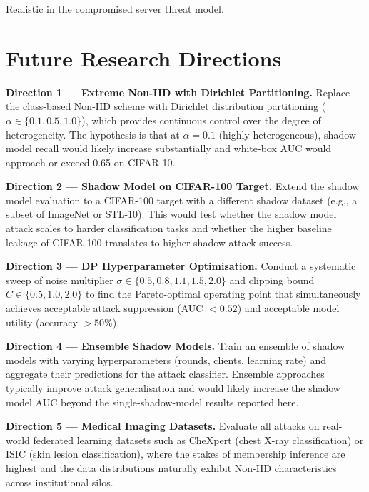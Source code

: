 \documentclass[12pt, a4paper]{report}
\begin{document}
\noindent *Realistic in the compromised server threat model.

\chapter{Future Research Directions}
\label{app:future}

\noindent\textbf{Direction 1 --- Extreme Non-IID with Dirichlet Partitioning.}
Replace the class-based Non-IID scheme with Dirichlet distribution partitioning
($\alpha \in \{0.1, 0.5, 1.0\}$), which provides continuous control over the
degree of heterogeneity. The hypothesis is that at $\alpha = 0.1$ (highly
heterogeneous), shadow model recall would likely increase substantially and white-box AUC would
approach or exceed 0.65 on CIFAR-10.

\noindent\textbf{Direction 2 --- Shadow Model on CIFAR-100 Target.}
Extend the shadow model evaluation to a CIFAR-100 target with a different
shadow dataset (e.g., a subset of ImageNet or STL-10). This would test whether
the shadow model attack scales to harder classification tasks and whether the
higher baseline leakage of CIFAR-100 translates to higher shadow attack success.

\noindent\textbf{Direction 3 --- DP Hyperparameter Optimisation.}
Conduct a systematic sweep of noise multiplier $\sigma \in \{0.5, 0.8, 1.1,
1.5, 2.0\}$ and clipping bound $C \in \{0.5, 1.0, 2.0\}$ to find the
Pareto-optimal operating point that simultaneously achieves acceptable attack
suppression (AUC $< 0.52$) and acceptable model utility (accuracy $> 50\%$).

\noindent\textbf{Direction 4 --- Ensemble Shadow Models.}
Train an ensemble of shadow models with varying hyperparameters (rounds, clients,
learning rate) and aggregate their predictions for the attack classifier. Ensemble
approaches typically improve attack generalisation and would likely increase the
shadow model AUC beyond the single-shadow-model results reported here.

\noindent\textbf{Direction 5 --- Medical Imaging Datasets.}
Evaluate all attacks on real-world federated learning datasets such as CheXpert
(chest X-ray classification) or ISIC (skin lesion classification), where the
stakes of membership inference are highest and the data distributions naturally
exhibit Non-IID characteristics across institutional silos.

\clearpage
{}
{}
\listoffigures
\end{document}
